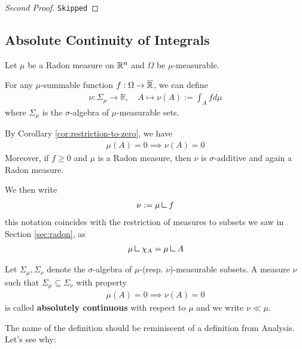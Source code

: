 \begin{proof}[Second Proof]
  \texttt{Skipped}
\end{proof}




\subsection{Absolute Continuity of Integrals}
Let $\mu$ be a Radon measure on $\mathbb{R}^{n}$ and $\Omega$ be $\mu$-measurable.

For any $\mu$-summable function $f: \Omega \to \overline{\mathbb{R}}$, we can define
\begin{align*}
  \nu: \Sigma_{\mu} \to \mathbb{R}, \quad
  A \mapsto \nu(A) := \int_{A} f d \mu
\end{align*}
where $\Sigma_{\mu}$ is the $\sigma$-algebra of $\mu$-measurable sets.

\begin{rem}[]
By Corollary \ref{cor:restriction-to-zero}, we have
\begin{align*}
  \mu(A) = 0 \implies \nu(A) = 0
\end{align*}
Moreover, if $f \geq 0$ and $\mu$ is a Radon measure, then $\nu$ is $\sigma$-additive and again a Radon measure.

We then write
\begin{align*}
  \nu := \mu \mres f
\end{align*}
this notation coincides with the restriction of measures to subsets we saw in Section \ref{sec:radon}, as
\begin{align*}
  \mu \mres \chi_{A} = \mu \mres A
\end{align*}
\end{rem}


\begin{dfn}[]
  Let $\Sigma_{\mu}, \Sigma_{\nu}$ denote the $\sigma$-algebra of $\mu$-(resp. $\nu$)-measurable subsets.
  A measure $\nu$ such that $\Sigma_{\mu} \subseteq \Sigma_{\nu}$ with property
  \begin{align*}
    \mu(A) = 0 \implies \nu(A) = 0
  \end{align*}
  is called \textbf{absolutely continuous} with respect to $\mu$ and we write $\nu \ll \mu$.
\end{dfn}

The name of the definition should be reminiscent of a definition from Analysis.
Let's see why:

